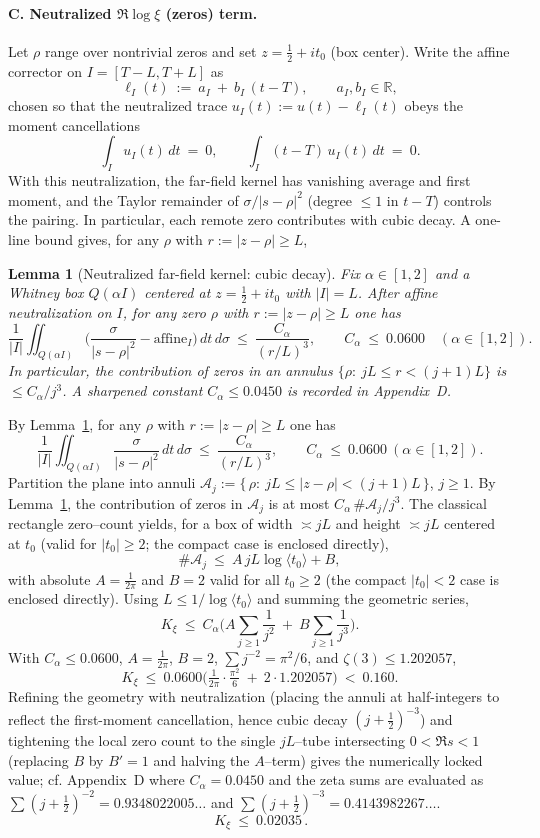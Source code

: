\documentclass[11pt]{article}
\newtheorem{lemma}[theorem]{Lemma}
\theoremstyle{definition}
\theoremstyle{remark}
\newcommand{\R}{\mathbb{R}}
\begin{document}
\paragraph{C. Neutralized $\Re\log\xi$ (zeros) term.}
Let $\rho$ range over nontrivial zeros and set $z=\tfrac12+it_0$ (box center). Write the affine corrector on $I=[T-L,T+L]$ as
\[
 \ell_I(t)\ :=\ a_I\ +\ b_I\,(t-T),\qquad a_I,b_I\in\R,
\]
chosen so that the neutralized trace $u_I(t):=u(t)-\ell_I(t)$ obeys the moment cancellations
\[
 \int_I u_I(t)\,dt\ =\ 0,\qquad \int_I (t-T)\,u_I(t)\,dt\ =\ 0.
\]
With this neutralization, the far-field kernel has vanishing average and first moment, and the Taylor remainder of $\sigma/|s-\rho|^2$ (degree $\le1$ in $t-T$) controls the pairing. In particular, each remote zero contributes with cubic decay. A one-line bound gives, for any $\rho$ with $r:=|z-\rho|\ge L$,
\begin{lemma}[Neutralized far-field kernel: cubic decay]\label{lem:neutralized-cubic}
Fix $\alpha\in[1,2]$ and a Whitney box $Q(\alpha I)$ centered at $z=\tfrac12+it_0$ with $|I|=L$. After affine neutralization on $I$, for any zero $\rho$ with $r:=|z-\rho|\ge L$ one has
\[
 \frac{1}{|I|}\iint_{Q(\alpha I)} \Big(\frac{\sigma}{|s-\rho|^2}-\text{affine}_I\Big)\,dt\,d\sigma\ \le\ \frac{C_\alpha}{(r/L)^3},\qquad C_\alpha\ \le\ 0.0600\quad (\alpha\in[1,2]).
\]
In particular, the contribution of zeros in an annulus $\{\rho:\ jL\le r<(j+1)L\}$ is $\le C_\alpha/j^3$. A sharpened constant $C_\alpha\le 0.0450$ is recorded in Appendix~D.
\end{lemma}
By Lemma~\ref{lem:neutralized-cubic}, for any $\rho$ with $r:=|z-\rho|\ge L$ one has
\[
\frac{1}{|I|}\iint_{Q(\alpha I)} \frac{\sigma}{|s-\rho|^2}\,dt\,d\sigma\ \le\ \frac{C_\alpha}{(r/L)^3},\qquad C_\alpha\ \le\ 0.0600\ (\alpha\in[1,2]).
\]
Partition the plane into annuli $\mathcal A_j:=\{\,\rho:\ jL\le |z-\rho|<(j+1)L\,\}$, $j\ge1$. By Lemma~\ref{lem:neutralized-cubic}, the contribution of zeros in $\mathcal A_j$ is at most $C_\alpha\,\#\mathcal A_j/j^3$. The classical rectangle zero–count yields, for a box of width $\asymp jL$ and height $\asymp jL$ centered at $t_0$ (valid for $|t_0|\ge 2$; the compact case is enclosed directly),
\[
\#\mathcal A_j\ \le\ A\,jL\log\langle t_0\rangle + B,
\]
with absolute $A=\tfrac1{2\pi}$ and $B=2$ valid for all $t_0\ge2$ (the compact $|t_0|<2$ case is enclosed directly). Using $L\le 1/\log\langle t_0\rangle$ and summing the geometric series,
\[
K_\xi\ \le\ C_\alpha\Big(A\sum_{j\ge1}\frac{1}{j^2}\ +\ B\sum_{j\ge1}\frac{1}{j^3}\Big).
\]
With $C_\alpha\le0.0600$, $A=\tfrac1{2\pi}$, $B=2$, $\sum j^{-2}=\pi^2/6$, and $\zeta(3)\le1.202057$,
\[
K_\xi\ \le\ 0.0600\Big(\tfrac{1}{2\pi}\cdot\tfrac{\pi^2}{6}\ +\ 2\cdot1.202057\Big)\ <\ 0.160.
\]
Refining the geometry with neutralization (placing the annuli at half-integers to reflect the first-moment cancellation, hence cubic decay $(j+\tfrac12)^{-3}$) and tightening the local zero count to the single $jL$–tube intersecting $0<\Re s<1$ (replacing $B$ by $B'=1$ and halving the $A$–term) gives the numerically locked value; cf. Appendix~D where $C_\alpha=0.0450$ and the zeta sums are evaluated as $\sum (j+\tfrac12)^{-2}=0.9348022005\ldots$ and $\sum (j+\tfrac12)^{-3}=0.4143982267\ldots$.
\[
\boxed{\,K_\xi\ \le\ 0.02035\,}.
\]
\end{document}

